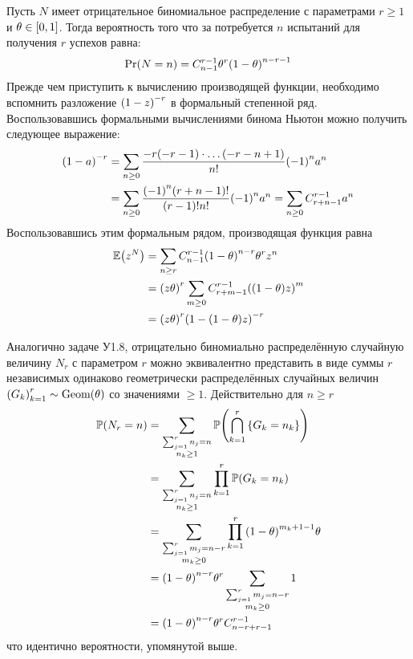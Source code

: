\documentclass[a4paper]{article}
\let\originalleft\left
\let\originalright\right
\renewcommand{\left}{\mathopen{}\mathclose\bgroup\originalleft}
\renewcommand{\right}{\aftergroup\egroup\originalright}
\newcommand{\obj}[1]{{\left\{ #1 \right \}}}
\newcommand{\clo}[1]{{\left [ #1 \right ]}}
\newcommand{\brac}[1]{{\left ( #1 \right )}}
\newcommand{\Ex}[0]{{\mathbb{E}}}
\newcommand{\pr}[0]{{\mathbb{P}}}
\begin{document}
Пусть $N$ имеет отрицательное биномиальное распределение с параметрами $r\geq1$
и $\theta\in \clo{0,1}$.
Тогда вероятность того что за потребуется $n$ испытаний для получения $r$
успехов равна:
\[\Pr(N=n) = C^{r-1}_{n-1} \theta^r \brac{1-\theta}^{n-r-1}\]
Прежде чем приступить к вычислению производящей функции, необходимо вспомнить
разложение $\brac{1-z}^{-r}$ в формальный степенной ряд. Воспользовавшись
формальными вычислениями бинома Ньютон можно получить следующее выражение:
\begin{align*}
\brac{1-a}^{-r} &= \sum_{n\geq 0} \frac{-r(-r-1)\cdot\ldots(-r-n+1)}{n!} \brac{-1}^n a^n \\
	&= \sum_{n\geq 0} \frac{{(-1)}^n (r+n-1)!}{(r-1)!n!} \brac{-1}^n a^n
	= \sum_{n\geq 0} C^{r-1}_{r+n-1} a^n
\end{align*}
Воспользовавшись этим формальным рядом, производящая функция равна
\begin{align*}
	\Ex\brac{z^N} &= \sum_{n\geq r} C^{r-1}_{n-1} \brac{1-\theta}^{n-r} \theta^r z^n \\
	&= {(z \theta)}^r \sum_{m\geq 0} C^{r-1}_{r+m-1} \brac{(1-\theta)z}^m \\
	&= {(z \theta)}^r \brac{1 - (1-\theta)z}^{-r} 
\end{align*}

Аналогично задаче У1.8, отрицательно биномиально распределённую случайную
величину $N_r$ с параметром $r$ можно эквивалентно представить в виде суммы
$r$ независимых одинаково геометрически распределённых случайных величин
$\brac{G_k}_{k=1}^r\sim \text{Geom}(\theta)$ со значениями $\geq1$.
Действительно для $n\geq r$ \begin{align*}
	\pr\brac{N_r = n} &= \sum_{\substack{\sum_{j=1}^r n_j = n \\ n_k\geq1}} \pr\brac{\bigcap_{k=1}^r \obj{G_k = n_k}} \\
	&= \sum_{\substack{\sum_{j=1}^r n_j = n \\ n_k\geq1}} \prod_{k=1}^r \pr\brac{G_k = n_k} \\
	&= \sum_{\substack{\sum_{j=1}^r m_j = n-r \\ m_k\geq0}} \prod_{k=1}^r {(1-\theta)}^{m_k+1-1} \theta \\
	&= {(1-\theta)}^{n-r} \theta^r \sum_{\substack{\sum_{j=1}^r m_j = n-r \\ m_k\geq0}} 1\\
	&= {(1-\theta)}^{n-r} \theta^r C^{r-1}_{n-r+r-1}\\
\end{align*}
что идентично вероятности, упомянутой выше.
\end{document}
